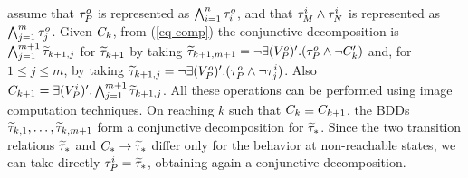 assume that $\tau^o_P$ is represented as $\bigwedge_{i=1}^n
\tau^o_i$, and that $\tau^i_M \wedge \tau^i_N$ is represented
as $\bigwedge_{j=1}^m \tau^o_j$. Given $C_k$, from
(\ref{eq-comp}) the conjunctive decomposition is
$\bigwedge_{j=1}^{m+1} \widetilde{\tau}_{k+1,j}$ for $\widetilde{\tau}_{k+1}$ by taking
$  \widetilde{\tau}_{k+1,m+1} = \neg \exists ({ V}^o_P)' .
  (\tau^o_P \wedge \neg C'_{k})$
and, for $1 \leq j \leq m$, by taking $   \widetilde{\tau}_{k+1,j}  = \neg
\exists ({ V}^o_P)' .
    (\tau^o_P \wedge \neg \tau^i_j)$.
Also $C_{k+1} = \exists ({ V}^i_P)' . \bigwedge_{j=1}^{m+1}
\widetilde{\tau}_{k+1,j}$. All these operations can be performed using image
computation techniques. On reaching $k$ such that $C_k \equiv
C_{k+1}$, the BDDs $\widetilde{\tau}_{k,1}, \ldots, \widetilde{\tau}_{k,m+1}$ form a
conjunctive decomposition for $\widetilde{\tau}_*$. Since the two transition
relations $\widetilde{\tau}_*$ and $C_* \rightarrow \widetilde{\tau}_*$ differ only for
the behavior at non-reachable states, we can take directly
$\tau^i_P = \widetilde{\tau}_*$, obtaining again a conjunctive
decomposition.
